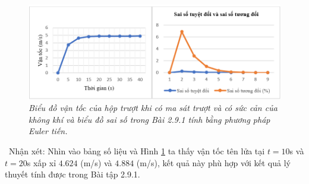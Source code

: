 \begin{figure}[H]
	\centering
	\includegraphics[scale=0.83]{Images/hinh_2_27.png}
	\caption[Biểu đồ vận tốc của hộp trượt khi có ma sát trượt và có sức cản của không khí và biểu đồ sai số trong Bài 2.9.1 tính bằng phương pháp Euler tiến.
	]{\itshape\fontsize{13pt}{0pt}\selectfont\centering Biểu đồ vận tốc của hộp trượt khi có ma sát trượt và có sức cản của không khí và biểu đồ sai số trong Bài 2.9.1 tính bằng phương pháp Euler tiến.}
	\label{hinh2.27}
\end{figure} 
\noindent\ Nhận xét: Nhìn vào bảng số liệu và Hình \ref{hinh2.27} ta thấy vận tốc tên lửa tại $t=10$s và $t=20$s xấp xỉ $4.624$ (m/s) và $4.884$ (m/s), kết quả này phù hợp với kết quả lý thuyết tính được trong Bài tập 2.9.1.